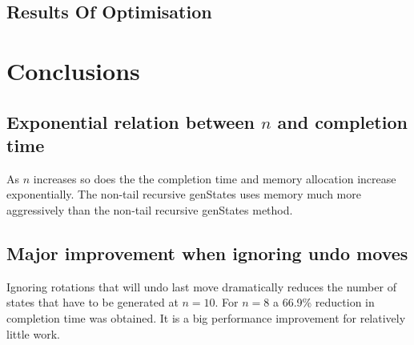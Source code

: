 \documentclass[]{article}
\begin{document}
\subsection{Results Of Optimisation}
\begin{table}[H]
	\begin{center}
		\noindent{}\caption{Memory usage and completion time for different size of \(n\)}\end{center}
	\label{table:mem_usage}
\end{table}
\section{Conclusions}
\subsection{Exponential relation between \(n\) and completion time}
As \(n\) increases so does the the completion time and memory allocation increase exponentially. The non-tail recursive genStates uses memory much more aggressively than the non-tail recursive genStates method.
\subsection{Major improvement when ignoring undo moves}
Ignoring rotations that will undo last move dramatically reduces the number of states that have to be generated at \(n = 10\). For \(n = 8\) a 66.9\% reduction in completion time was obtained. It is a big performance improvement for relatively little work.
\end{document}
